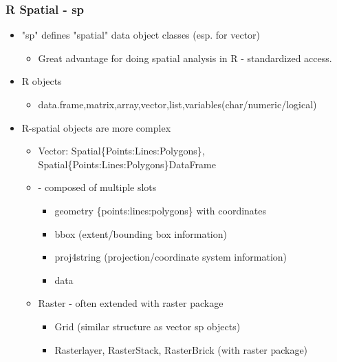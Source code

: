 \documentclass[11pt]{beamer}
\begin{document}
\begin{frame}
\frametitle{R Spatial - sp}
\begin{itemize}
\item "sp" defines "spatial" data object classes (esp. for vector)
\begin{itemize}
\item Great advantage for doing spatial analysis in R - standardized access.
\end{itemize}
\item R objects
\begin{itemize}
\item data.frame,matrix,array,vector,list,variables(char/numeric/logical)
\end{itemize}
\item R-spatial objects are more complex
\begin{itemize}
\item Vector: Spatial\{Points:Lines:Polygons\}, Spatial\{Points:Lines:Polygons\}DataFrame
\item  - composed of multiple slots
\begin{itemize}
\item geometry \{points:lines:polygons\} with coordinates
\item bbox (extent/bounding box information)
\item proj4string (projection/coordinate system information)
\item data
\end{itemize}
\item Raster - often extended with raster package
\begin{itemize}
\item Grid (similar structure as vector sp objects)
\item Rasterlayer, RasterStack, RasterBrick (with raster package)
\end{itemize}
\end{itemize}
\end{itemize}
\end{frame}
\end{document}
